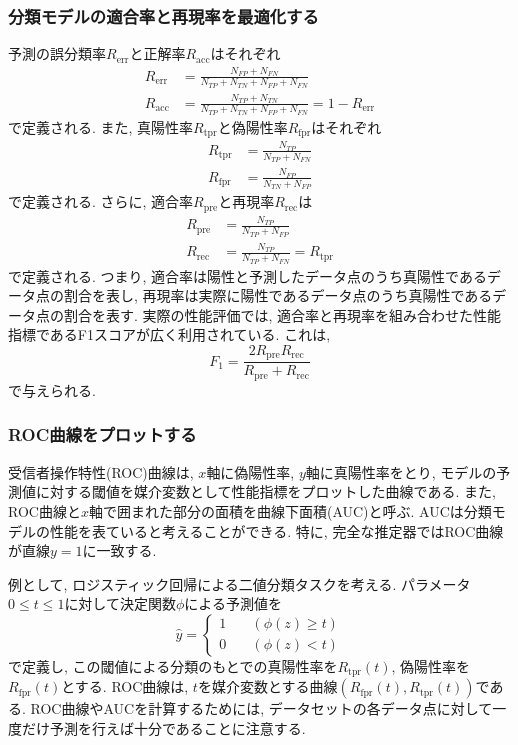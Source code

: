 \documentclass[uplatex]{jsarticle}
\theoremstyle{definition}
\numberwithin{equation}{section}
\begin{document}
\subsubsection{分類モデルの適合率と再現率を最適化する}
予測の誤分類率$R_{\mathrm{err}}$と正解率$R_{\mathrm{acc}}$はそれぞれ
\begin{align}
    R_{\mathrm{err}} &= \frac{N_{FP} + N_{FN}}{N_{TP} + N_{TN} + N_{FP} + N_{FN}} \\
    R_{\mathrm{acc}} &= \frac{N_{TP} + N_{TN}}{N_{TP} + N_{TN} + N_{FP} + N_{FN}} = 1 - R_{\mathrm{err}}
\end{align}
で定義される.
また, 真陽性率$R_{\mathrm{tpr}}$と偽陽性率$R_{\mathrm{fpr}}$はそれぞれ
\begin{align}
    R_{\mathrm{tpr}} &= \frac{N_{TP}}{N_{TP} + N_{FN}} \\
    R_{\mathrm{fpr}} &= \frac{N_{FP}}{N_{TN} + N_{FP}}
\end{align}
で定義される.
さらに, 適合率$R_{\mathrm{pre}}$と再現率$R_{\mathrm{rec}}$は
\begin{align}
    R_{\mathrm{pre}} &= \frac{N_{TP}}{N_{TP} + N_{FP}} \\
    R_{\mathrm{rec}} &= \frac{N_{TP}}{N_{TP} + N_{FN}} = R_{\mathrm{tpr}}
\end{align}
で定義される.
つまり, 適合率は陽性と予測したデータ点のうち真陽性であるデータ点の割合を表し, 再現率は実際に陽性であるデータ点のうち真陽性であるデータ点の割合を表す.
実際の性能評価では, 適合率と再現率を組み合わせた性能指標であるF1スコアが広く利用されている.
これは, 
\begin{equation}
    F_{1} = \frac{2R_{\mathrm{pre}}R_{\mathrm{rec}}}{R_{\mathrm{pre}} + R_{\mathrm{rec}}}
\end{equation}
で与えられる.

\subsubsection{ROC曲線をプロットする}
受信者操作特性(ROC)曲線は, $x$軸に偽陽性率, $y$軸に真陽性率をとり, モデルの予測値に対する閾値を媒介変数として性能指標をプロットした曲線である.
また, ROC曲線と$x$軸で囲まれた部分の面積を曲線下面積(AUC)と呼ぶ.
AUCは分類モデルの性能を表ていると考えることができる.
特に, 完全な推定器ではROC曲線が直線$y = 1$に一致する.

例として, ロジスティック回帰による二値分類タスクを考える. 
パラメータ$0 \leq t \leq 1$に対して決定関数$\phi$による予測値を
\begin{equation}
    \hat{y} =
    \begin{cases}
        1 &\quad (\phi(z) \geq t) \\
        0 &\quad (\phi(z) < t)
    \end{cases}
\end{equation}
で定義し, この閾値による分類のもとでの真陽性率を$R_{\mathrm{tpr}}(t)$, 偽陽性率を$R_{\mathrm{fpr}}(t)$とする.
ROC曲線は, $t$を媒介変数とする曲線$(R_{\mathrm{fpr}}(t), R_{\mathrm{tpr}}(t))$である.
ROC曲線やAUCを計算するためには, データセットの各データ点に対して一度だけ予測を行えば十分であることに注意する.
\end{document}
